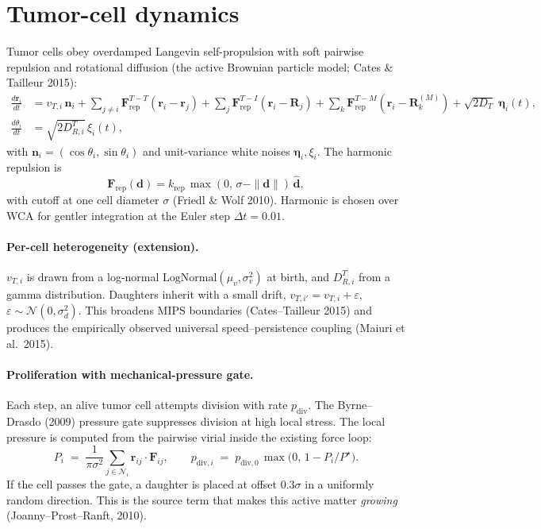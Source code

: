 \documentclass[11pt,letterpaper]{article}
\begin{document}
\section{Tumor-cell dynamics}

Tumor cells obey overdamped Langevin self-propulsion with soft pairwise
repulsion and rotational diffusion (the active Brownian particle model;
Cates \& Tailleur 2015):
\begin{align}
\frac{d\mathbf{r}_i}{dt}
  &= v_{T,i}\, \mathbf{n}_i
   + \sum_{j\ne i} \mathbf{F}_{\text{rep}}^{T-T}(\mathbf{r}_i-\mathbf{r}_j)
   + \sum_{j} \mathbf{F}_{\text{rep}}^{T-I}(\mathbf{r}_i-\mathbf{R}_j)
   + \sum_{k} \mathbf{F}_{\text{rep}}^{T-M}(\mathbf{r}_i-\mathbf{R}_k^{(M)})
   + \sqrt{2 D_T}\;\bm{\eta}_i(t), \label{eq:tumor_pos}\\
\frac{d\theta_i}{dt}
  &= \sqrt{2 D_{R,i}^{T}}\,\xi_i(t),
\end{align}
with $\mathbf{n}_i = (\cos\theta_i, \sin\theta_i)$ and unit-variance
white noises $\bm{\eta}_i, \xi_i$. The harmonic repulsion is
\begin{equation}
\mathbf{F}_{\text{rep}}(\mathbf{d})
   = k_{\text{rep}}\,\max(0,\,\sigma - \|\mathbf{d}\|)\,\hat{\mathbf{d}},
\label{eq:harmonic}
\end{equation}
with cutoff at one cell diameter $\sigma$ (Friedl \& Wolf 2010). Harmonic
is chosen over WCA for gentler integration at the Euler step
$\Delta t = 0.01$.

\paragraph{Per-cell heterogeneity (extension).}
$v_{T,i}$ is drawn from a log-normal $\mathrm{LogNormal}(\mu_v,\sigma_v^2)$
at birth, and $D_{R,i}^{T}$ from a gamma distribution. Daughters
inherit with a small drift,
$v_{T,i'} = v_{T,i} + \varepsilon$,
$\varepsilon \sim \mathcal{N}(0,\sigma_d^2)$. This broadens MIPS
boundaries (Cates--Tailleur 2015) and produces the empirically observed
universal speed--persistence coupling (Maiuri et al.\ 2015).

\paragraph{Proliferation with mechanical-pressure gate.}
Each step, an alive tumor cell attempts division with rate
$p_{\text{div}}$. The Byrne--Drasdo (2009) pressure gate suppresses
division at high local stress. The local pressure is computed from the
pairwise virial inside the existing force loop:
\begin{equation}
P_i \;=\; \frac{1}{\pi\sigma^2}\sum_{j\in\mathcal{N}_i}\mathbf{r}_{ij}\cdot\mathbf{F}_{ij},
\qquad
p_{\text{div},i} \;=\; p_{\text{div},0}\,\max\!\big(0,\,1 - P_i/P^\star\big).
\label{eq:pressure-gate}
\end{equation}
If the cell passes the gate, a daughter is placed at offset $0.3\sigma$
in a uniformly random direction. This is the source term that makes
this active matter \emph{growing} (Joanny--Prost--Ranft, 2010).
\end{document}
